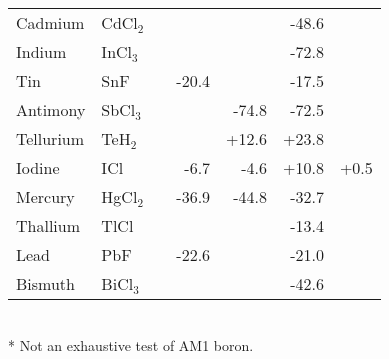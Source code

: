 \begin{table}
\begin{center}
\begin{tabular}{llrrrrr}
Cadmium    & CdCl$_2$  &            &      &       &-48.6  \\
Indium     & InCl$_3$  &            &      &       &-72.8  \\
Tin        & SnF       &            & -20.4&       &-17.5  \\
Antimony   & SbCl$_3$  &            &      & -74.8 &-72.5  \\
Tellurium  & TeH$_2$   &            &      & +12.6 &+23.8  \\
Iodine     & ICl       &            &  -6.7& -4.6  &+10.8 & +0.5 \\
Mercury    & HgCl$_2$  &            & -36.9&-44.8  &-32.7  \\
Thallium   & TlCl      &            &      &       &-13.4  \\
Lead       & PbF       &            & -22.6&       &-21.0  \\
Bismuth    & BiCl$_3$  &            &      &       &-42.6  \\
\hline
\end{tabular} \\
* Not an exhaustive test of AM1 boron.
\end{center}
\end{table}
